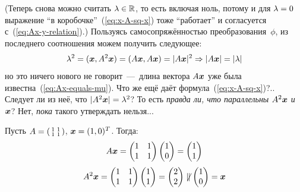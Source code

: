 \documentclass[a4paper,12pt]{article}
\makeatletter
\newcommand*{\Relbarfill@}{\arrowfill@\Relbar\Relbar\Relbar}
\newcommand*{\xeq}[2][]{\ext@arrow 0055\Relbarfill@{#1}{#2}}
\theoremstyle{remark}
\makeatother
\begin{document}
  (Теперь снова можно считать $\lambda \hm\in \RR$, то есть включая ноль, потому и для $\lambda \hm= 0$ выражение ``в коробочке''~(\ref{eq:x-A-sq-x}) тоже ``работает'' и согласуется с~(\ref{eq:Ax-y-relation}).)
  Пользуясь самосопряжённостью преобразования~$\phi$, из последнего соотношения можем получить следующее:
  \[
    \lambda^2 = (\boldsymbol x, A^2 \boldsymbol x) = (A \boldsymbol x, A \boldsymbol x) = |A \boldsymbol x|^2 \Rightarrow |A \boldsymbol x| = |\lambda|
  \]
  но это ничего нового не говорит~---~длина вектора $A \boldsymbol x$ уже была известна~(\ref{eq:Ax-equals-mu}).
  Что же ещё даёт формула~(\ref{eq:x-A-sq-x})?..
  Следует ли из неё, что $|A^2 \bds x| \hm= \lambda^2$?
  То есть \emph{правда ли, что параллельны $A^2 \boldsymbol x$ и $\boldsymbol x$}?
  Нет, \emph{пока} такого утверждать нельзя...
  
  \begin{example}
    Пусть $A \hm= \left(\begin{smallmatrix}1 & 1 \\ 1 & 1\end{smallmatrix}\right)$, $\bds x \hm= (1, 0)^T$.
    Тогда:
    \[
      A \boldsymbol x = \begin{pmatrix}
        1 & 1\\
        1 & 1
      \end{pmatrix} \begin{pmatrix}
        1\\
        0
      \end{pmatrix} = \begin{pmatrix}
        1\\
        1
      \end{pmatrix}
    \]
    \[
      A^2 \boldsymbol x = \begin{pmatrix}
        1 & 1\\
        1 & 1
      \end{pmatrix} \begin{pmatrix}
        1\\
        1
      \end{pmatrix} = \begin{pmatrix}
        2\\
        2
      \end{pmatrix} \not\parallel \begin{pmatrix}
        1\\
        0
      \end{pmatrix} = \boldsymbol x
    \]
  \end{example}
  
\end{document}
